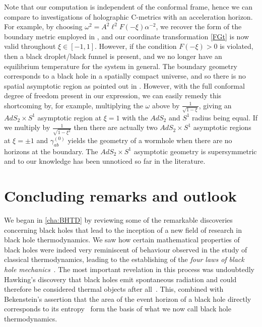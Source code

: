 \documentclass[
twoside,
openright,
frontopenright,
]{dmathesis}
\begin{document}
Note that our computation is independent of the conformal frame, hence we can
compare to investigations of holographic C-metrics with an acceleration
horizon. For example, by choosing $\omega^2 = A^2\ell^2F(-\xi)\alpha^{-2}$, we
recover the form of the boundary metric employed in \cite{Hubeny:2009kz}, and
our coordinate transformation \eqref{FGt} is now valid throughout
$\xi\in[-1,1]$. However, if the condition $ F(-\xi)>0$ is violated, then a black
droplet/black funnel is present, and we no longer have an equilibrium
temperature for the system in general.  The boundary geometry corresponds to a
black hole in a spatially compact universe, and so there is no spatial
asymptotic region as pointed out in \cite{Hubeny:2009kz}. However, with the full
conformal degree of freedom present in our expression, we can easily remedy this
shortcoming by, for example, multiplying the $\omega$ above by
$\frac{1}{\sqrt{1-\xi}}$, giving an $AdS_{2}\times S^{1}$ asymptotic region at
$\xi=1$ with the $AdS_{2}$ and $S^{1}$ radius being equal. If we multiply by
$\frac{1}{\sqrt{1-\xi^2}}$ then there are actually two $AdS_{2}\times S^{1}$
asymptotic regions at $\xi=\pm1$ and $\gamma^{(0)}_{ab}$ yields the geometry of
a wormhole when there are no horizons at the boundary.  The
$AdS_{2}\times S^{1}$ asymptotic geometry is supersymmetric and to our knowledge
has been unnoticed so far in the literature.

\chapter{Concluding remarks and outlook}

We began in \cref{cha:BHTD} by reviewing some of the remarkable
discoveries~\cite{Hawking:1971tu, Hawking:1971vc, Bekenstein:1972tm,
  Bekenstein:1973ur, Bardeen:1973gs, Bekenstein:1973mi, Bekenstein:1974ax,
  Hawking:1974rv, Hawking:1974sw, Hawking:1976de} concerning black holes that
lead to the inception of a new field of research in black hole
thermodynamics. We saw how certain mathematical properties of black holes were
indeed very reminiscent of behaviour observed in the study of classical
thermodynamics, leading to the establishing of the \emph{four laws of black hole
  mechanics}~\cite{Bardeen:1973gs}. The most important revelation in this
process was undoubtedly Hawking's discovery that black holes emit spontaneous
radiation and could therefore be considered thermal objects after
all~\cite{Hawking:1974rv,Hawking:1974sw}. This, combined with Bekenstein's
assertion that the area of the event horizon of a black hole directly
corresponds to its entropy~\cite{Bekenstein:1972tm, Bekenstein:1973ur,
  Bekenstein:1974ax} form the basis of what we now call black hole
thermodynamics.
\end{document}
